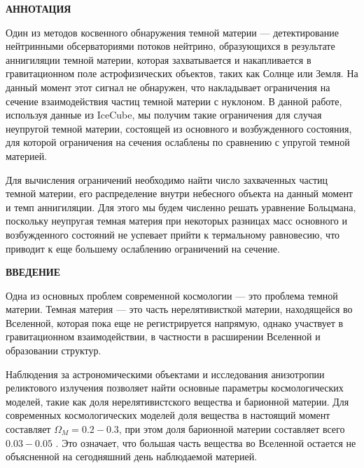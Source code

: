 \newpage
\begin{center}
  \textbf{\large АННОТАЦИЯ}
\end{center}

Один из методов косвенного обнаружения темной материи --- детектирование нейтринными обсерваториями потоков нейтрино, образующихся в результате аннигиляции темной материи, которая захватывается и накапливается  в гравитационном поле астрофизических объектов, таких как Солнце или Земля. На данный момент этот сигнал не обнаружен, что накладывает ограничения на сечение взаимодействия частиц темной материи с нуклоном. В данной работе, используя данные из IceCube, мы получим такие ограничения для случая неупругой темной материи, состоящей из основного и возбужденного состояния, для которой ограничения на сечения ослаблены по сравнению с упругой темной материей. 

Для вычисления ограничений необходимо найти число захваченных частиц темной материи, его распределение внутри небесного объекта на данный момент и темп аннигиляции. Для этого мы будем численно решать уравнение Больцмана, поскольку неупругая темная материя при некоторых разницах масс основного и возбужденного состояний не успевает прийти к термальному равновесию, что приводит к еще большему ослаблению ограничений на сечение.

\onehalfspacing
\setcounter{page}{2}

\newpage
\renewcommand{\contentsname}{\centerline{\large СОДЕРЖАНИЕ}}
\tableofcontents

\newpage
\begin{center}
  \textbf{\large ВВЕДЕНИЕ}
\end{center}


Одна из основных проблем современной космологии --- это проблема темной материи.  Темная материя --- это часть нерелятивисткой материи, находящейся во Вселенной, которая пока еще не регистрируется напрямую, однако участвует в гравитационном взаимодействии, в частности в расширении Вселенной и образовании структур. 


Наблюдения за астрономическими объектами и исследования анизотропии реликтового излучения позволяет найти основные параметры космологических моделей, такие как доля нерелятивистского вещества и барионной материи. Для современных космологических моделей доля вещества в настоящий момент составляет $\Omega_M = 0.2-0.3$, при этом доля барионной материи составляет всего $0.03-0.05$ \cite{Cao_2023}. Это означает, что большая часть вещества во Вселенной остается не объясненной на сегодняшний день наблюдаемой материей.

